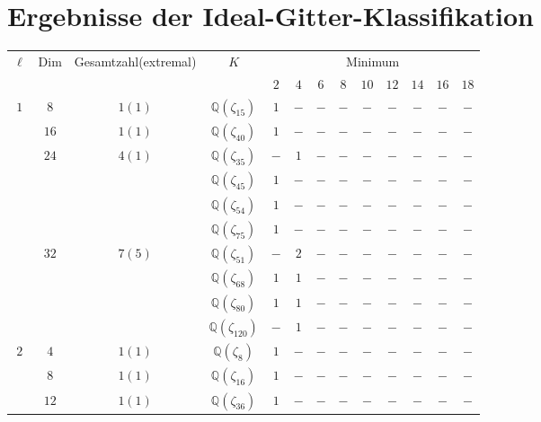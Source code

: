 \documentclass[12pt,a4paper,halfparskip,headsepline,bibtotocnumbered]{scrreprt}
\theoremstyle{nummermitklammern}
\theoremstyle{nonumberbreak}
\newcommand{\Q}{\mathbb{Q}}
\begin{document}
\section{Ergebnisse der Ideal-Gitter-Klassifikation}
\begin{table}[H]
	\centering
	\begin{tabular}{|c|c|c|c|c|c|c|c|c|c|c|c|c|}
		\hline		
		\multirow{2}{*}{$\ell$}	&\multirow{2}{*}{Dim}	&\multirow{2}{*}{Gesamtzahl(extremal)}	&\multirow{2}{*}{$K$}	&\multicolumn{9}{c|}{Minimum}\\ \cline{5-13}
								&						&							&					&$2$	&$4$	&$6$	&$8$	&$10$	&$12$	&$14$	&$16$	&$18$\\ \hline
		\multirow{10}{*}{$1$}	&$8$					&$1(1)$						&$\Q(\zeta_{15})$	&$1$	&$-$	&$-$	&$-$	&$-$	&$-$	&$-$	&$-$	&$-$\\ \cline{2-13}
								&$16$					&$1(1)$						&$\Q(\zeta_{40})$	&$1$	&$-$	&$-$	&$-$	&$-$	&$-$	&$-$	&$-$	&$-$\\ \cline{2-13}
								&\multirow{4}{*}{$24$}	&\multirow{4}{*}{$4(1)$}	&$\Q(\zeta_{35})$	&$-$	&$1$	&$-$	&$-$	&$-$	&$-$	&$-$	&$-$	&$-$\\ \cline{4-13}
								&						&							&$\Q(\zeta_{45})$	&$1$	&$-$	&$-$	&$-$	&$-$	&$-$	&$-$	&$-$	&$-$\\ \cline{4-13}
								&						&							&$\Q(\zeta_{54})$	&$1$	&$-$	&$-$	&$-$	&$-$	&$-$	&$-$	&$-$	&$-$\\ \cline{4-13}
								&						&							&$\Q(\zeta_{75})$	&$1$	&$-$	&$-$	&$-$	&$-$	&$-$	&$-$	&$-$	&$-$\\ \cline{2-13}
								&\multirow{4}{*}{$32$}	&\multirow{4}{*}{$7(5)$}	&$\Q(\zeta_{51})$	&$-$	&$2$	&$-$	&$-$	&$-$	&$-$	&$-$	&$-$	&$-$\\ \cline{4-13}
								&						&							&$\Q(\zeta_{68})$	&$1$	&$1$	&$-$	&$-$	&$-$	&$-$	&$-$	&$-$	&$-$\\ \cline{4-13}
								&						&							&$\Q(\zeta_{80})$	&$1$	&$1$	&$-$	&$-$	&$-$	&$-$	&$-$	&$-$	&$-$\\ \cline{4-13}
								&						&							&$\Q(\zeta_{120})$	&$-$	&$1$	&$-$	&$-$	&$-$	&$-$	&$-$	&$-$	&$-$\\ \hline
		\multirow{3}{*}{$2$}	&$4$					&$1(1)$						&$\Q(\zeta_{8})$	&$1$	&$-$	&$-$	&$-$	&$-$	&$-$	&$-$	&$-$	&$-$\\ \cline{2-13}
								&$8$					&$1(1)$						&$\Q(\zeta_{16})$	&$1$	&$-$	&$-$	&$-$	&$-$	&$-$	&$-$	&$-$	&$-$\\ \cline{2-13}
								&$12$					&$1(1)$						&$\Q(\zeta_{36})$	&$1$	&$-$	&$-$	&$-$	&$-$	&$-$	&$-$	&$-$	&$-$\\ \hline
	\end{tabular}
\end{table}
\end{document}
